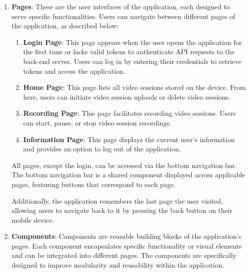 \begin{enumerate}
    \item \textbf{Pages}: These are the user interfaces of the application, each designed to serve specific functionalities. Users can navigate between different pages of the application, as described below:  
    \begin{enumerate}  
        \item \textbf{Login Page}: This page appears when the user opens the application for the first time or lacks valid tokens to authenticate API requests to the back-end server. Users can log in by entering their credentials to retrieve tokens and access the application.  
        \item \textbf{Home Page}: This page lists all video sessions stored on the device. From here, users can initiate video session uploads or delete video sessions.  
        \item \textbf{Recording Page}: This page facilitates recording video sessions. Users can start, pause, or stop video session recordings.  
        \item \textbf{Information Page}: This page displays the current user's information and provides an option to log out of the application.  
    \end{enumerate}  
    All pages, except the login, can be accessed via the bottom navigation bar. The bottom navigation bar is a shared component displayed across applicable pages, featuring buttons that correspond to each page.  
    
    Additionally, the application remembers the last page the user visited, allowing users to navigate back to it by pressing the back button on their mobile device.      

    \item \textbf{Components}: Components are reusable building blocks of the application's pages. Each component encapsulates specific functionality or visual elements and can be integrated into different pages. The components are specifically designed to improve modularity and reusability within the application.
    

\end{enumerate}
